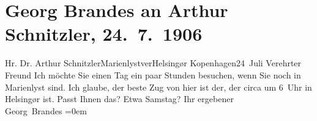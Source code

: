 

         \renewcommand{\erwaehnteOrte}{Orte: Helsingør, Kopenhagen, Marienlyst}
         \renewcommand{\erwaehnteWerke}{}
               \section[Georg Brandes an Arthur Schnitzler, 24. 7. 1906]{ Georg Brandes an Arthur Schnitzler, 24. 7. 1906}\nopagebreak{}\rehead{ }\begin{ledgroupsized}[t]{13cm}\normalsize\beginnumbering \toendnotes[C]{\smallbreak\pagebreak[2]} 
\pstart{}{\pb}Hr. Dr. Arthur
                  Schnitzler\pend{}\pstart{}Marienlyst\pend{}\pstart{}ver\pend{}\pstart{}Helsingør\pend{}{\bigskip}\pstart
           \raggedleft{}{\pb}Kopenhagen24 Juli\pend
           \pstart{}Verehrter Freund\pend\pstart
           Ich möchte Sie einen Tag ein paar Stunden besuchen, wenn Sie noch in Marienlyst sind. Ich glaube, der beste Zug von
               hier ist der, der circa um 6 Uhr in Helsingør ist. Passt Ihnen das? Etwa Samstag?\pend
           \pstart
           Ihr ergebener{\\[\baselineskip]}\spacefill\mbox{Georg Brandes}\pend
           \leftskip=0em{}
         
         \endnumbering{}\end{ledgroupsized}  \newcommand{\dateiname}{L01615}\newcommand{\titel}{Georg Brandes an Arthur Schnitzler, 24. 7. 1906}\newcommand{\editorInnen}{Martin Anton Müller und Gerd-Hermann Susen}
      